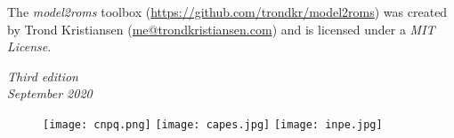 \noindent The \textit{model2roms} toolbox (\textcolor{bleu_cite}{\href{https://github.com/trondkr/model2roms}{https://github.com/trondkr/model2roms}}) was created by Trond 
          Kristiansen (\textcolor{bleu_cite}{\href{me@trondkristiansen.com}{me@trondkristiansen.com}}) and is licensed under a \textit{MIT License}. 
\bigskip

\noindent \textit{Third edition} 
\\ 
\noindent \textit{September 2020} 
\\

\begin{figure}[H]
    \centering
    \vspace*{\fill}
    \texttt{[image: cnpq.png]}
    \hspace{3cm}
    \texttt{[image: capes.jpg]}
    \hspace{3cm}    
    \texttt{[image: inpe.jpg]}
\end{figure}
